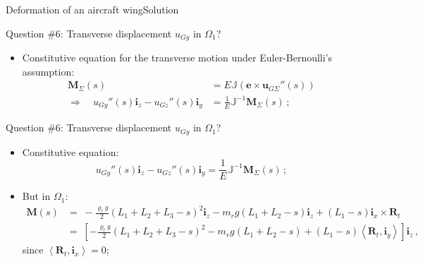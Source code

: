 \documentclass{beamer}
\newcommand{\imply}{\Rightarrow}
\newcommand{\uj}{u}
\newcommand{\xj}{x}
\newcommand{\yj}{y}
\newcommand{\zj}{z}
\newcommand{\uv}{{\boldsymbol\uj}}
\newcommand{\ej}{e}
\renewcommand{\ij}{i}
\newcommand{\ev}{{\boldsymbol\ej}}
\newcommand{\iv}{{\boldsymbol\ij}}
\newcommand{\medium}{\Omega}
\newcommand*{\Mstaticj}{J}
\newcommand*{\Mstatic}{{\mathbb\Mstaticj}}
\newcommand{\roi}{\varrho}
\newcommand{\Fresj}{R}
\newcommand{\Mresj}{M}
\newcommand{\Fres}{{\boldsymbol\Fresj}}
\newcommand{\Mres}{{\boldsymbol\Mresj}}
\newcommand{\scal}[1]{\left\langle{#1}\right\rangle}
\begin{document}
\begin{frame}{Deformation of an aircraft wing}{Solution}

\begin{overprint}

\vskip-20pt
\begin{exampleblock}{Question \#6: Transverse displacement $\uj_{G\yj}$ in $\medium_1$?}
\begin{itemize}
\item Constitutive equation for the transverse motion under Euler-Bernoulli's assumption:
\begin{displaymath}
\begin{split}
\Mres_\Sigma(s) &=E\Mstatic(\ev\times\uv_{G\Sigma}''(s)) \\
\imply\quad\uj_{G\yj}''(s)\iv_\zj-\uj_{G\zj}''(s)\iv_\yj &=\frac{1}{E}\Mstatic^{-1}\Mres_\Sigma(s)\,;
\end{split}
\end{displaymath}
\end{itemize}
\end{exampleblock}

\vskip-20pt
\begin{exampleblock}{Question \#6: Transverse displacement $\uj_{G\yj}$ in $\medium_1$?}
\begin{itemize}
\item Constitutive equation:
\begin{displaymath}
\uj_{G\yj}''(s)\iv_\zj-\uj_{G\zj}''(s)\iv_\yj=\frac{1}{E}\Mstatic^{-1}\Mres_\Sigma(s)\,;
\end{displaymath}
\item But in $\medium_1$:
\begin{displaymath}
\begin{split}
\!\!\!\!\Mres(s) &= \scriptstyle\; -\frac{\roi_l g}{2}(L_1+L_2+L_3-s)^2\iv_\zj- m_r g(L_1+L_2-s)\iv_\zj + (L_1-s)\iv_\xj\times\Fres_t \\
\!\!\!\!&= \scriptstyle\; \left[-\frac{\roi_l g}{2}(L_1+L_2+L_3-s)^2 - m_r g(L_1+L_2-s) + (L_1-s)\scal{\Fres_t,\iv_\yj}\right] \iv_\zj\,,
\end{split}
\end{displaymath}
since $\scal{\Fres_t,\iv_\xj}=0$;
\end{itemize}
\end{exampleblock}


\end{overprint}
\end{frame}
\end{document}
